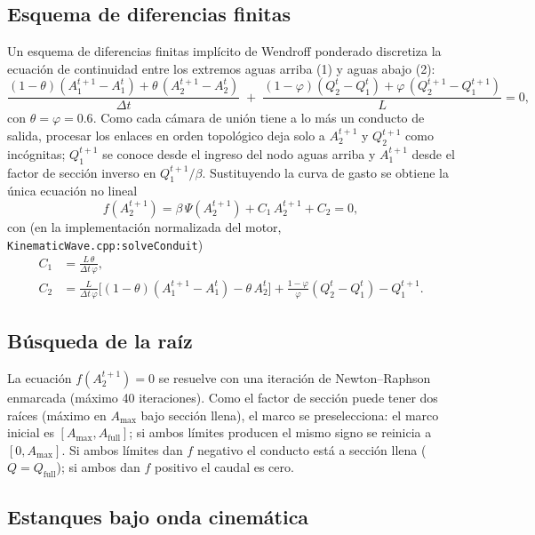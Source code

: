 \documentclass[11pt,a4paper]{article}
\begin{document}
\subsection{Esquema de diferencias finitas}

Un esquema de diferencias finitas implícito de Wendroff ponderado discretiza la
ecuación de continuidad entre los extremos aguas arriba (1) y aguas abajo (2):
\begin{equation}
  \frac{(1-\theta)(A_1^{t+1}-A_1^{t}) +
        \theta\,(A_2^{t+1}-A_2^{t})}{\Delta t}
  \;+\;
  \frac{(1-\varphi)(Q_2^{t}-Q_1^{t}) +
        \varphi\,(Q_2^{t+1}-Q_1^{t+1})}{L}
  = 0,
\end{equation}
con $\theta = \varphi = 0.6$. Como cada cámara de unión tiene a lo más un
conducto de salida, procesar los enlaces en orden topológico deja solo a
$A_2^{t+1}$ y $Q_2^{t+1}$ como incógnitas; $Q_1^{t+1}$ se conoce desde el
ingreso del nodo aguas arriba y $A_1^{t+1}$ desde el factor de sección inverso
en $Q_1^{t+1}/\beta$. Sustituyendo la curva de gasto se obtiene la única
ecuación no lineal
\begin{equation}
  f\!\left(A_2^{t+1}\right) = \beta\,\Psi\!\left(A_2^{t+1}\right) +
  C_1\,A_2^{t+1} + C_2 = 0,
\end{equation}
con (en la implementación normalizada del motor,
\texttt{KinematicWave.cpp:solveConduit})
\begin{align}
  C_1 &= \frac{L\,\theta}{\Delta t\,\varphi},\\
  C_2 &= \frac{L}{\Delta t\,\varphi}
        \Big[(1-\theta)(A_1^{t+1} - A_1^t) - \theta\,A_2^t\Big]
        + \frac{1-\varphi}{\varphi}(Q_2^t - Q_1^t) - Q_1^{t+1}.
\end{align}

\subsection{Búsqueda de la raíz}

La ecuación $f(A_2^{t+1}) = 0$ se resuelve con una iteración de Newton--Raphson
enmarcada (máximo 40 iteraciones). Como el factor de sección puede tener dos
raíces (máximo en $A_{\max}$ bajo sección llena), el marco se preselecciona:
el marco inicial es $[A_{\max}, A_{\mathrm{full}}]$; si ambos límites producen
el mismo signo se reinicia a $[0, A_{\max}]$. Si ambos límites dan $f$ negativo
el conducto está a sección llena ($Q = Q_{\mathrm{full}}$); si ambos dan $f$
positivo el caudal es cero.

\subsection{Estanques bajo onda cinemática}
\end{document}
